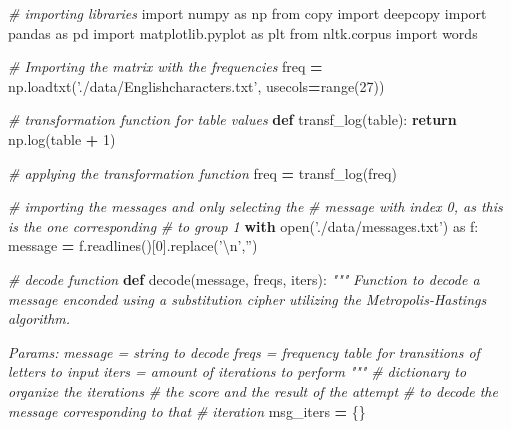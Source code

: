 \documentclass[]{article}
\newenvironment{Shaded}{\begin{snugshade}}{\end{snugshade}}
\newcommand{\BuiltInTok}[1]{#1}
\newcommand{\CharTok}[1]{\textcolor[rgb]{0.31,0.60,0.02}{#1}}
\newcommand{\CommentTok}[1]{\textcolor[rgb]{0.56,0.35,0.01}{\textit{#1}}}
\newcommand{\ControlFlowTok}[1]{\textcolor[rgb]{0.13,0.29,0.53}{\textbf{#1}}}
\newcommand{\DecValTok}[1]{\textcolor[rgb]{0.00,0.00,0.81}{#1}}
\newcommand{\ImportTok}[1]{#1}
\newcommand{\KeywordTok}[1]{\textcolor[rgb]{0.13,0.29,0.53}{\textbf{#1}}}
\newcommand{\NormalTok}[1]{#1}
\newcommand{\OperatorTok}[1]{\textcolor[rgb]{0.81,0.36,0.00}{\textbf{#1}}}
\newcommand{\StringTok}[1]{\textcolor[rgb]{0.31,0.60,0.02}{#1}}
\begin{document}
\begin{Shaded}
\begin{Highlighting}[]
\CommentTok{# importing libraries}
\ImportTok{import}\NormalTok{ numpy }\ImportTok{as}\NormalTok{ np}
\ImportTok{from}\NormalTok{ copy }\ImportTok{import}\NormalTok{ deepcopy}
\ImportTok{import}\NormalTok{ pandas }\ImportTok{as}\NormalTok{ pd}
\ImportTok{import}\NormalTok{ matplotlib.pyplot }\ImportTok{as}\NormalTok{ plt}
\ImportTok{from}\NormalTok{ nltk.corpus }\ImportTok{import}\NormalTok{ words}

\CommentTok{# Importing the matrix with the frequencies}
\NormalTok{freq }\OperatorTok{=}\NormalTok{  np.loadtxt(}\StringTok{'./data/Englishcharacters.txt'}\NormalTok{, usecols}\OperatorTok{=}\BuiltInTok{range}\NormalTok{(}\DecValTok{27}\NormalTok{))}

\CommentTok{# transformation function for table values}
\KeywordTok{def}\NormalTok{ transf_log(table):}
    \ControlFlowTok{return}\NormalTok{ np.log(table }\OperatorTok{+} \DecValTok{1}\NormalTok{)}

\CommentTok{# applying the transformation function}
\NormalTok{freq }\OperatorTok{=}\NormalTok{ transf_log(freq)}

\CommentTok{# importing the messages and only selecting the }
\CommentTok{# message with index 0, as this is the one corresponding}
\CommentTok{# to group 1}
\ControlFlowTok{with} \BuiltInTok{open}\NormalTok{(}\StringTok{'./data/messages.txt'}\NormalTok{) }\ImportTok{as}\NormalTok{ f:}
\NormalTok{    message }\OperatorTok{=}\NormalTok{ f.readlines()[}\DecValTok{0}\NormalTok{].replace(}\StringTok{'}\CharTok{\textbackslash{}n}\StringTok{'}\NormalTok{,}\StringTok{''}\NormalTok{)}

\CommentTok{# decode function}
\KeywordTok{def}\NormalTok{ decode(message, freqs, iters):}
    \CommentTok{"""}
\CommentTok{    Function to decode a message enconded }
\CommentTok{    using a substitution cipher utilizing the}
\CommentTok{    Metropolis-Hastings algorithm.}

\CommentTok{    Params:}
\CommentTok{    message = string to decode}
\CommentTok{    freqs = frequency table for transitions of letters}
\CommentTok{            to input}
\CommentTok{    iters = amount of iterations to perform}
\CommentTok{    """}
    \CommentTok{# dictionary to organize the iterations}
    \CommentTok{# the score and the result of the attempt}
    \CommentTok{# to decode the message corresponding to that}
    \CommentTok{# iteration}
\NormalTok{    msg_iters }\OperatorTok{=}\NormalTok{ \{\}}


\end{Highlighting}
\end{Shaded}
\end{document}
